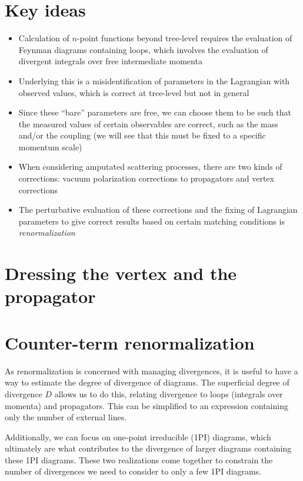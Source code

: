 \documentclass[12pt]{memoir}
\begin{document}
\section{Key ideas}

\begin{itemize}
  \item Calculation of $n$-point functions beyond tree-level requires the evaluation of Feynman diagrams
    containing loops, which involves the evaluation of divergent integrals over free intermediate momenta
  \item Underlying this is a misidentification of parameters in the Lagrangian with observed values,
    which is correct at tree-level but not in general
  \item Since these ``bare'' parameters are free, we can choose them to be such that
    the measured values of certain observables are correct,
    such as the mass and/or the coupling (we will see that this must be fixed to a specific momentum scale)
  \item When considering amputated scattering processes, there are two kinds of corrections:
    vacuum polarization corrections to propagators and vertex corrections
  \item The perturbative evaluation of these corrections
    and the fixing of Lagrangian parameters to give correct results
    based on certain matching conditions is \textit{renormalization}
\end{itemize}

\section{Dressing the vertex and the propagator}

\section{Counter-term renormalization}

As renormalization is concerned with managing divergences,
it is useful to have a way to estimate the degree of divergence of diagrams.
The superficial degree of divergence $D$ allows us to do this,
relating divergence to loops (integrals over momenta) and propagators.
This can be simplified to an expression containing only the number of external lines.

Additionally, we can focus on one-point irreducible (1PI) diagrams,
which ultimately are what contributes to the divergence of larger diagrams containing these 1PI diagrams.
These two realizations come together to constrain the number of divergences we need to consider
to only a few 1PI diagrams.
\end{document}

